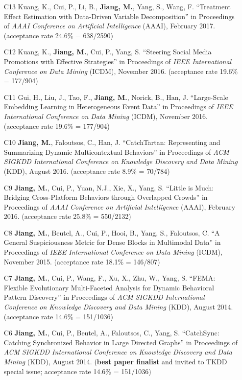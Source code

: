 \documentclass[10pt]{article}
\newenvironment{myindentpar}[1]%
{\begin{list}{}%
         {\setlength{\leftmargin}{#1}}%
         \item[]%
}
{\end{list}}
\newcounter{list}
\begin{document}
\begin{myindentpar}{0.00cm}
\begin{enumerate}[leftmargin=.5cm]
\item[C13] Kuang, K., Cui, P., Li, B., \textbf{Jiang, M.}, Yang, S., Wang, F. ``Treatment Effect Estimation with Data-Driven Variable Decomposition'' in Proceedings of \textit{AAAI Conference on Artificial Intelligence} (AAAI), February 2017. (acceptance rate 24.6\% = 638/2590)

\item[C12] Kuang, K., \textbf{Jiang, M.}, Cui, P., Yang, S. ``Steering Social Media Promotions with Effective Strategies'' in Proceedings of \textit{IEEE International Conference on Data Mining} (ICDM), November 2016. (acceptance rate 19.6\% = 177/904)

\item[C11] Gui, H., Liu, J., Tao, F., \textbf{Jiang, M.}, Norick, B., Han, J. ``Large-Scale Embedding Learning in Heterogeneous Event Data'' in Proceedings of \textit{IEEE International Conference on Data Mining} (ICDM), November 2016. (acceptance rate 19.6\% = 177/904)

\item[C10] \textbf{Jiang, M.}, Faloutsos, C., Han, J. ``CatchTartan: Representing and Summarizing Dynamic Multicontextual Behaviors'' in Proceedings of \textit{ACM SIGKDD International Conference on Knowledge Discovery and Data Mining} (KDD), August 2016. (acceptance rate 8.9\% = 70/784)

\item[C9] \textbf{Jiang, M.}, Cui, P., Yuan, N.J., Xie, X., Yang, S. ``Little is Much: Bridging Cross-Platform Behaviors through Overlapped Crowds'' in Proceedings of \textit{AAAI Conference on Artificial Intelligence} (AAAI), February 2016. (acceptance rate 25.8\% = 550/2132)

\item[C8] \textbf{Jiang, M.}, Beutel, A., Cui, P., Hooi, B., Yang, S., Faloutsos, C. ``A General Suspiciousness Metric for Dense Blocks in Multimodal Data'' in Proceedings of \textit{IEEE International Conference on Data Mining} (ICDM), November 2015. (acceptance rate 18.1\% = 146/807)

\item[C7] \textbf{Jiang, M.}, Cui, P., Wang, F., Xu, X., Zhu, W., Yang, S. ``FEMA: Flexible Evolutionary Multi-Faceted Analysis for Dynamic Behavioral Pattern Discovery'' in Proceedings of \textit{ACM SIGKDD International Conference on Knowledge Discovery and Data Mining} (KDD), August 2014. (acceptance rate 14.6\% = 151/1036)

\item[C6] \textbf{Jiang, M.}, Cui, P., Beutel, A., Faloutsos, C., Yang, S. ``CatchSync: Catching Synchronized Behavior in Large Directed Graphs'' in Proceedings of \textit{ACM SIGKDD International Conference on Knowledge Discovery and Data Mining} (KDD), August 2014. (\textbf{best paper finalist} and invited to TKDD special issue; acceptance rate 14.6\% = 151/1036)
	

\end{enumerate}
\end{myindentpar}
\end{document}
